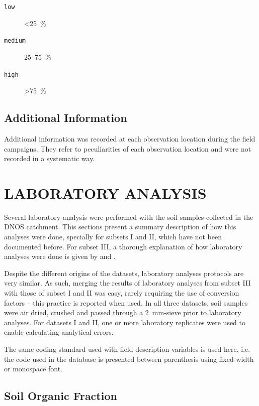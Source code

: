 \begin{description}
\item[\texttt{low}] \SI{<25}{\percent}
\item[\texttt{medium}] 25--\SI{75}{\percent}
\item[\texttt{high}] \SI{>75}{\percent}
\end{description}

\subsection{Additional Information}

Additional information was recorded at each observation location during the field campaigns. They refer to 
peculiarities of each observation location and were not recorded in a systematic way.

\section{LABORATORY ANALYSIS}
\label{sec:chap04-laboratory}

Several laboratory analysis were performed with the soil samples collected in the DNOS catchment. This 
sections present a summary description of how this analyses were done, specially for subsets I and II, which 
have not been documented before. For subset III, a thorough explanation of how laboratory analyses were done 
is given by \citet{Pedron2005} and \citet{Miguel2010}.

Despite the different origins of the datasets, laboratory analyses protocols are very similar. As such, 
merging the results of laboratory analyses from subset III with those of subset I and II was easy, rarely 
requiring the use of conversion factors -- this practice is reported when used. In all three datasets, soil 
samples were air dried, crushed and passed through a \SI{2}{\milli\metre}-sieve prior to laboratory analyses. 
For datasets I and II, one or more laboratory replicates were used to enable calculating analytical errors.

The same coding standard used with field description variables is used here, i.e. the code used in the 
database is presented between parenthesis using fixed-width or monospace font.

\subsection{Soil Organic Fraction}
\label{sec:chap04-organic}

